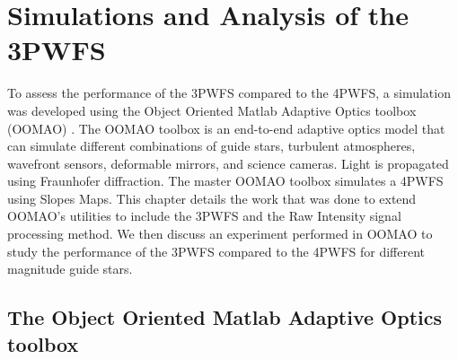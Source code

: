 \chapter{Simulations and Analysis of the 3PWFS}\label{CH4}

To assess the performance of the 3PWFS compared to the 4PWFS, a simulation was developed using the Object Oriented Matlab Adaptive Optics toolbox (OOMAO) \citep{OOMAO}. The OOMAO toolbox is an end-to-end adaptive optics model that can simulate different combinations of guide stars, turbulent atmospheres, wavefront sensors, deformable mirrors, and science cameras. Light is propagated using Fraunhofer diffraction. The master OOMAO toolbox simulates a 4PWFS using Slopes Maps. This chapter details the work that was done to extend OOMAO's utilities to include the 3PWFS and the Raw Intensity signal processing method. We then discuss an experiment performed in OOMAO to study the performance of the 3PWFS compared to the 4PWFS for different magnitude guide stars. 

\section{The Object Oriented Matlab Adaptive Optics toolbox}

